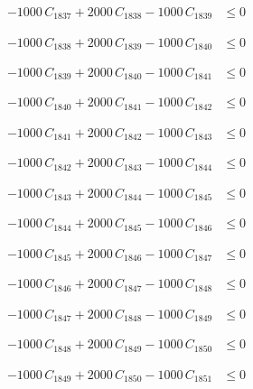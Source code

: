 \documentclass[a4paper,11pt]{article}
\begin{document}
\begin{align}
-1000\,C_{1837} + 2000\,C_{1838} - 1000\,C_{1839} &\leq 0 \nonumber
\end{align}

\begin{align}
-1000\,C_{1838} + 2000\,C_{1839} - 1000\,C_{1840} &\leq 0 \nonumber
\end{align}

\begin{align}
-1000\,C_{1839} + 2000\,C_{1840} - 1000\,C_{1841} &\leq 0 \nonumber
\end{align}

\begin{align}
-1000\,C_{1840} + 2000\,C_{1841} - 1000\,C_{1842} &\leq 0 \nonumber
\end{align}

\begin{align}
-1000\,C_{1841} + 2000\,C_{1842} - 1000\,C_{1843} &\leq 0 \nonumber
\end{align}

\begin{align}
-1000\,C_{1842} + 2000\,C_{1843} - 1000\,C_{1844} &\leq 0 \nonumber
\end{align}

\begin{align}
-1000\,C_{1843} + 2000\,C_{1844} - 1000\,C_{1845} &\leq 0 \nonumber
\end{align}

\begin{align}
-1000\,C_{1844} + 2000\,C_{1845} - 1000\,C_{1846} &\leq 0 \nonumber
\end{align}

\begin{align}
-1000\,C_{1845} + 2000\,C_{1846} - 1000\,C_{1847} &\leq 0 \nonumber
\end{align}

\begin{align}
-1000\,C_{1846} + 2000\,C_{1847} - 1000\,C_{1848} &\leq 0 \nonumber
\end{align}

\begin{align}
-1000\,C_{1847} + 2000\,C_{1848} - 1000\,C_{1849} &\leq 0 \nonumber
\end{align}

\begin{align}
-1000\,C_{1848} + 2000\,C_{1849} - 1000\,C_{1850} &\leq 0 \nonumber
\end{align}

\begin{align}
-1000\,C_{1849} + 2000\,C_{1850} - 1000\,C_{1851} &\leq 0 \nonumber
\end{align}
\end{document}
